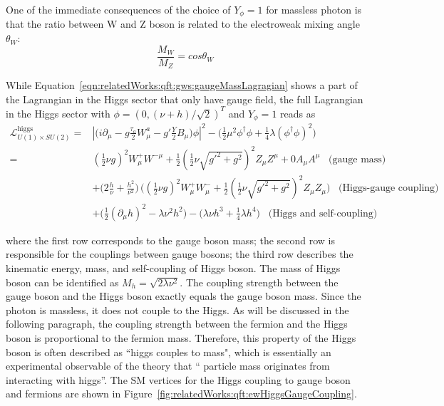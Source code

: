 \noindent One of the immediate consequences of the choice of $Y_{\phi}=1$ for massless photon is that the ratio between W and Z boson is related to the electroweak mixing angle $\theta_W$:
\begin{equation}
\frac{M_W}{M_Z} = cos\theta_W
\end{equation}

\noindent While Equation~\ref{eqn:relatedWorks:qft:gws:gaugeMassLagragian} shows a part of the Lagrangian in the Higgs sector that only have gauge field, the full Lagrangian in the Higgs sector with $\phi = (0, (\nu+h) /\sqrt{2} )^T $  and  $Y_{\phi} = 1$ reads as
\begin{equation}
\begin{split}
    \mathcal{L}_{U(1)\times SU(2)}^{\text{higgs}} 
    = & \left\lvert  \big( i \partial_\mu -g \frac{\tau_a}{2} W^a_\mu -g'\frac{Y}{2} B_\mu \big)\phi \right\rvert ^2 - \big(\frac{1}{2} \mu^2 \phi^\dagger\phi + \frac{1}{4} \lambda(\phi^\dagger\phi )^2 \big)\\
    = &  (\frac{1}{2}\nu g)^2 W^+_\mu W^{-\mu} +  \frac{1}{2} (\frac{1}{2}\nu \sqrt{g'^2+g^2})^2 Z_\mu Z^\mu + 0 A_\mu A^\mu  \;\;\; \text{(gauge mass)} \\
    & + \big( 2 \frac{h}{\nu} + \frac{h^2}{\nu^2} \big) \, \big( (\frac{1}{2}\nu g)^2 W^+_\mu W^-_\mu + \frac{1}{2} (\frac{1}{2}\nu \sqrt{g'^2+g^2})^2  Z_\mu Z_\mu \big) \;\;\; \text{(Higgs-gauge coupling)}\\
    & + \big(\frac{1}{2} (\partial_\mu h)^2 -\lambda\nu^2h^2\big)  - \big ( \lambda \nu h^3 + \frac{1}{4}\lambda h^4 \big) \;\;\; \text{(Higgs and self-coupling)}
\end{split}
\end{equation}

\noindent where the first row corresponds to the gauge boson mass; the second row is responsible for the couplings between gauge bosons; the third row describes the kinematic energy, mass, and self-coupling of Higgs boson. The mass of Higgs boson can be identified as $M_h=\sqrt{2\lambda \nu^2}$. The coupling strength between the gauge boson and the Higgs boson exactly equals the gauge boson mass. Since the photon is massless, it does not couple to the Higgs. As will be discussed in the following paragraph, the coupling strength between the fermion and the Higgs boson is proportional to the fermion mass. Therefore, this property of the Higgs boson is often described as ``higgs couples to mass", which is essentially an experimental observable of the theory that `` particle mass originates from interacting with higgs''. The SM vertices for the Higgs coupling to gauge boson and fermions are shown in Figure~\ref{fig:relatedWorks:qft:ewHiggsGaugeCoupling}.

